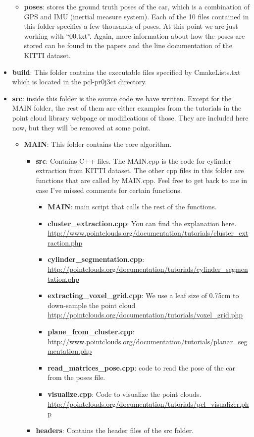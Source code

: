 \documentclass[twoside]{article}
\begin{document}
\begin{itemize}
\begin{itemize}
	\item \textbf{poses}: stores the ground truth poses of the car, which is a combination of GPS and IMU (inertial measure system). Each of the 10 files contained in this folder specifies a few thousands of poses. At this point we are just working with “00.txt”. Again, more information about how the poses are stored can be found in the papers and the line documentation of the KITTI dataset.	
\end{itemize}

\item \textbf{build}: This folder contains the executable files specified by CmakeLists.txt  which is located in the pcl-pr0j3ct directory.
\item \textbf{src}: inside this folder is the source code we have written. Except for the MAIN folder, the rest of them are either examples from the tutorials in the point cloud library webpage or modifications of those. They are included here now, but they will be removed at some point. 

\begin{itemize}
	\item \textbf{MAIN}: This folder contains the core algorithm. 
	\begin{itemize}
		\item \textbf{src}: Contains C++ files. The MAIN.cpp is the code for cylinder extraction from KITTI dataset. The other cpp files in this folder are functions that are called by MAIN.cpp. Feel free to get back to me in case I’ve missed comments for certain functions.
		\begin{itemize}
			\item \textbf{MAIN}: main script that calls the rest of the functions.
			\item \textbf{cluster\_extraction.cpp}: You can find the explanation here. \url{http://www.pointclouds.org/documentation/tutorials/cluster_extraction.php}
			\item \textbf{cylinder\_segmentation.cpp}: \url{http://pointclouds.org/documentation/tutorials/cylinder\_segmentation.php}
			\item \textbf{extracting\_voxel\_grid.cpp}: We use a leaf size of 0.75cm to down-sample the point cloud \url{http://pointclouds.org/documentation/tutorials/voxel\_grid.php}
			\item \textbf{plane\_from\_cluster.cpp}: \url{http://www.pointclouds.org/documentation/tutorials/planar_segmentation.php}
			\item \textbf{read\_matrices\_pose.cpp}: code to read the pose of the car from the poses file.
			\item \textbf{visualize.cpp}: Code to visualize the point clouds. \url{http://pointclouds.org/documentation/tutorials/pcl_visualizer.php}
		\end{itemize}
		\item \textbf{headers}: Contains the header files of the src folder.
	\end{itemize}
\end{itemize}

\end{itemize}
\end{document}
